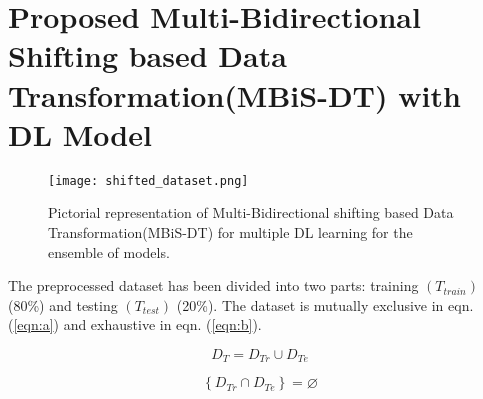 



\section{Proposed Multi-Bidirectional Shifting based Data Transformation(MBiS-DT) with DL Model}
\begin{figure}[ht!]
\centering
\texttt{[image: shifted\_dataset.png]}
\caption{Pictorial representation of Multi-Bidirectional shifting based Data Transformation(MBiS-DT) for multiple DL learning for the ensemble of models.}
\label{fig:shifted_dataset}
\end{figure}
The preprocessed dataset has been divided into two parts: training \((T_{train})\) (80\%) and testing \((T_{test})\) (20\%). The dataset is mutually exclusive in eqn. (\ref{eqn:a}) and exhaustive in eqn. (\ref{eqn:b}).

\begin{equation}
\label{eqn:a}
D_{T}=D_{Tr}\cup D_{Te}
\end{equation}

\begin{equation}
\label{eqn:b}
\left \{ D_{Tr} \cap D_{Te} \right \}=\varnothing
\end{equation}


